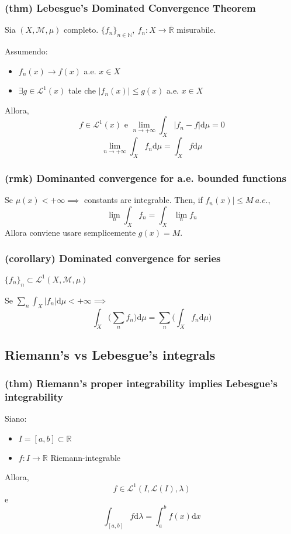 \subsubsection{(thm) Lebesgue's Dominated Convergence Theorem}
Sia $(X,\mathcal M,\mu)$ completo.
$\{ f_n\}_{n\in \mathbb N}, \ f_n:X\to \overline{\mathbb R}$ misurabile.

Assumendo:
\begin{itemize}
    \item $f_n(x)\to f(x)$ a.e. $x\in X$
    \item $\exists g\in \mathcal L^1(x)$ tale che $|f_n(x)|\leq g(x)$ a.e. $x\in X$
\end{itemize}
Allora,
$$f\in \mathcal L^1(x) \text{ e }\lim_{n\to +\infty}\int_X|f_n-f|\mathrm d\mu=0$$
$$\lim_{n\to +\infty}\int_Xf_n\mathrm d\mu=\int_X f\mathrm d\mu$$

\subsubsection{(rmk) Dominanted convergence for a.e. bounded functions}
Se $\mu(x)<+\infty \implies$ constants are integrable. Then, if $f_n(x)|\leq M\ a.e.$,
$$\lim_n\int_X f_n=\int_X\lim_n f_n$$
Allora conviene usare semplicemente $g(x) = M$.
\subsubsection{(corollary) Dominated convergence for series}
$\{f_n\}_n\subset \mathcal L^1(X,\mathcal M,\mu)$

Se $\sum_n\int_X |f_n|\mathrm d\mu <+\infty \implies$ $$ \int_X\Big ( \sum_n f_n\Big ) \mathrm d\mu = \sum_n\Big ( \int_X f_n \mathrm d\mu\Big )$$
\subsection{Riemann's vs Lebesgue's integrals}
\subsubsection{(thm) Riemann's proper integrability implies Lebesgue's integrability}
Siano:
\begin{itemize}
    \item $I=[a,b]\subset \mathbb R$
    \item $f:I\to \mathbb R$ Riemann-integrable
\end{itemize}
Allora,
$$f\in \mathcal L^1(I,\mathcal L(I),\lambda)$$
e
$$\int_{[a,b]} f \mathrm d\lambda = \int_a^b f(x) \mathrm dx$$
